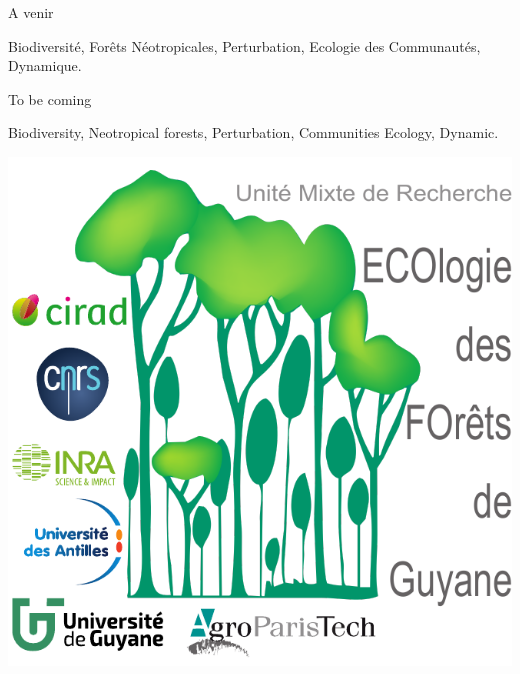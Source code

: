 \documentclass[
  11pt,
  french,
  A4paper,
  extrafontsizes,onecolumn,openright
  ]{memoir}
\begin{document}

\backmatter
\SmallMargins

%
\printbibliography










\evenpage
\SmallMargins
\thispagestyle{empty}

\begin{normalsize}

\begin{description}

\item[Résumé:]
A venir

\item[Mots clés :]
Biodiversité, Forêts Néotropicales, Perturbation, Ecologie des Communautés, Dynamique.
~\\

\item[Abstract:]
To be coming

\item[Keywords:]
Biodiversity, Neotropical forests, Perturbation, Communities Ecology, Dynamic.

\end{description}

\end{normalsize}

\vspace*{\fill}
\centering\includegraphics[width=.3\textwidth]{images/Logo-Lab}
\end{document}
